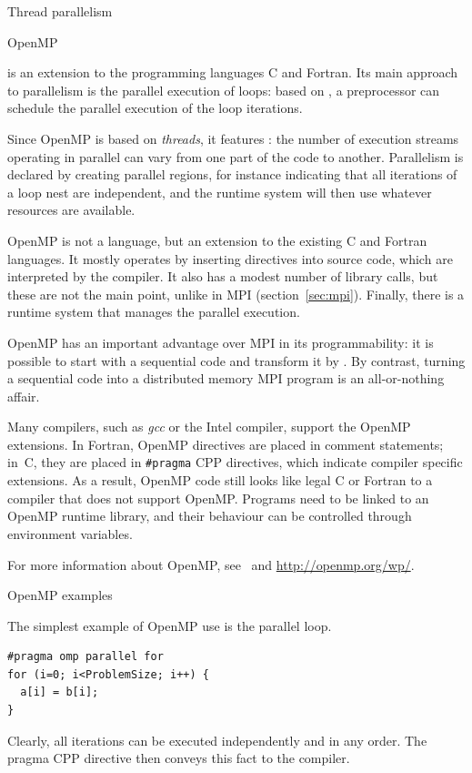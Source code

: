  {Thread parallelism}
\label{sec:threads}


 {OpenMP}
\label{sec:openmp}

 is an extension to the programming languages
C and Fortran.
Its main approach to parallelism is the parallel execution of loops:
based on , a preprocessor can schedule the parallel
execution of the loop iterations.

Since OpenMP is based on \emph{threads},
it features : the number of
execution streams operating in parallel can vary from one part of the
code to another. Parallelism is declared by creating
parallel regions, for instance indicating that all iterations 
of a loop nest are independent,
and the runtime system will then use whatever resources
are available.

OpenMP is not a language, but an extension to the existing C and
Fortran languages. It mostly operates by inserting
directives into source code, which are interpreted by the
compiler. It also has a modest number of library calls, but these are
not the main point, unlike in MPI (section~\ref{sec:mpi}). Finally,
there is a runtime system that manages the parallel execution.

OpenMP has an important advantage over MPI in its programmability:
it is possible to start with a sequential code and transform
it by . By contrast,
turning a sequential code into a distributed memory MPI program
is an all-or-nothing affair.

Many compilers, such as \emph{gcc} or the Intel compiler, support
the OpenMP extensions. In Fortran, OpenMP directives are placed in
comment statements; in~C, they are placed in \verb+#pragma+ CPP
directives, which indicate compiler specific extensions. As a result,
OpenMP code still looks like legal C or Fortran to a compiler that
does not support OpenMP. Programs need to be linked to an OpenMP
runtime library, and their behaviour can be controlled through
environment variables.

For more information about OpenMP, see~\cite{Chapman2008:OpenMPbook}
and \url{http://openmp.org/wp/}.

 {OpenMP examples}
\label{omp:examples}

The simplest example of OpenMP use is the parallel loop. 
\begin{verbatim}
#pragma omp parallel for
for (i=0; i<ProblemSize; i++) {
  a[i] = b[i];
}
\end{verbatim}
Clearly, all iterations can be executed independently and in any
order. The pragma CPP directive then conveys this fact to the
compiler.

